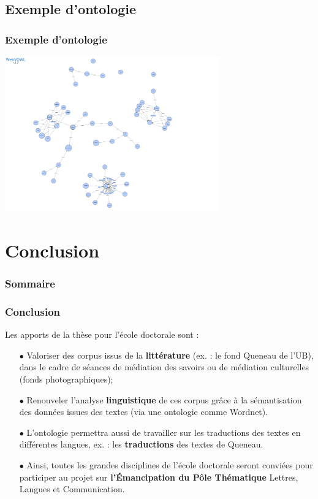 \documentclass[xcolor=dvipsnames]{beamer}
\begin{document}
\subsection{Exemple d'ontologie}
\begin{frame}[fragile]
\frametitle{Exemple d'ontologie}
	\includegraphics[height = 6.7cm]{images/Ontologie_1.png}
\end{frame}

\section{Conclusion}
\begin{frame}
\frametitle{Sommaire}
\tableofcontents[currentsection]
\end{frame}

\begin{frame}[fragile]
\frametitle{Conclusion}
\begin{block}{Les apports de la thèse pour l'école doctorale sont :}
	\small{
		\begin{itemize}
			\item[$\bullet$]Valoriser des corpus issus de la \textbf{littérature} (ex. : le fond Queneau de l'UB), dans le cadre de séances de médiation des savoirs ou de médiation culturelles (fonds photographiques);
			\item[$\bullet$]Renouveler l'analyse \textbf{linguistique} de ces corpus grâce à la sémantisation des données issues des textes (via une ontologie comme Wordnet).
			\item[$\bullet$]L'ontologie permettra aussi de travailler sur les traductions des textes en différentes langues, ex. : les \textbf{traductions} des textes de Queneau.
			\item[$\bullet$]Ainsi, toutes les grandes disciplines de l'école doctorale seront conviées pour participer au projet sur \textbf{l'Émancipation du Pôle Thématique} Lettres, Langues et Communication.
	\end{itemize}}
\end{block}
\vspace{3cm}
\end{frame}
\end{document}
